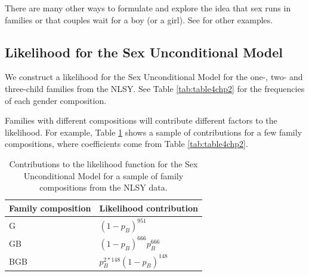 \documentclass[
]{krantz}
\begin{document}
\begin{table}
\centering
\caption{\label{tab:table7chp2}Proportion of families in NLSY data with only one boy who is born last.}
\centering
{}
\end{table}

There are many other ways to formulate and explore the idea that sex runs in families or that couples wait for a boy (or a girl). See \citet{Rodgers2001} for other examples.

\subsection{Likelihood for the Sex Unconditional Model}\label{likelihood-for-the-sex-unconditional-model}

We construct a likelihood for the Sex Unconditional Model for the one-, two- and three-child families from the NLSY. See Table \ref{tab:table4chp2} for the frequencies of each gender composition.

Families with different compositions will contribute different factors to the likelihood. For example, Table \ref{tab:sexuncondmodel} shows a sample of contributions for a few family compositions, where coefficients come from Table \ref{tab:table4chp2}.

\begin{table}
\centering
\caption{\label{tab:sexuncondmodel}Contributions to the likelihood function for the Sex Unconditional Model for a sample of family compositions from the NLSY data.}
\centering
\begin{tabular}[t]{>{\raggedright\arraybackslash}p{5cm}>{\raggedright\arraybackslash}p{5cm}}
\toprule
Family composition & Likelihood contribution\\
\midrule
G & $(1-p_B)^{951}$\\
GB & $(1-p_B)^{666}p_B^{666}$\\
BGB & $p_B^{2*148}(1-p_B)^{148}$\\
\bottomrule
\end{tabular}
\end{table}
\end{document}
